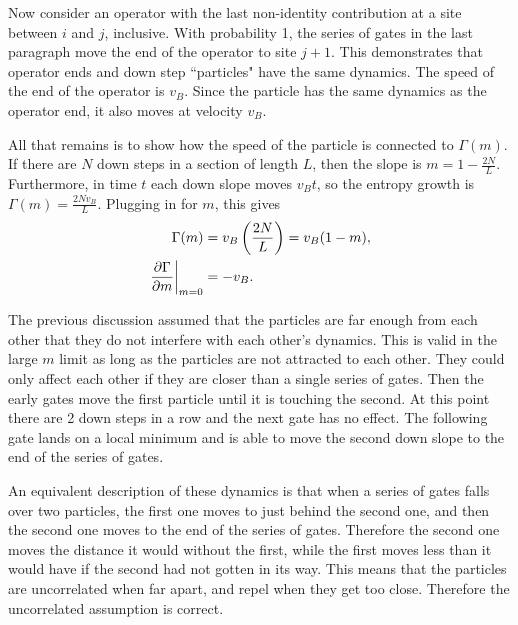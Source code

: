 Now consider an operator with the last non-identity contribution at a site between $i$ and $j$, inclusive. With probability 1, the series of gates in the last paragraph move the end of the operator to site $j+1$. This demonstrates that operator ends and down step ``particles" have the same dynamics. The speed of the end of the operator is $v_B$. Since the particle has the same dynamics as the operator end, it also moves at velocity $v_B$. 

All that remains is to show how the speed of the particle is connected to $\Gamma(m)$. If there are $N$ down steps in a section of length $L$, then the slope is $m = 1-\frac{2N}{L}$. Furthermore, in time $t$ each down slope moves $v_Bt$, so the entropy growth is $\Gamma(m)=\frac{2Nv_B}{L}$. Plugging in for $m$, this gives
\begin{align}
\Gamma(m) &= v_B\left(\frac{2N}{L}\right) = v_B(1-m),\\
\left.\frac{\partial \Gamma}{\partial m}\right|_{m=0}  &= -v_B.
\end{align}

The previous discussion assumed that the particles are far enough from each other that they do not interfere with each other's dynamics. This is valid in the large $m$ limit as long as the particles are not attracted to each other. They could only affect each other if they are closer than a single series of gates. Then the early gates move the first particle until it is touching the second. At this point there are 2 down steps in a row and the next gate has no effect. The following gate lands on a local minimum and is able to move the second down slope to the end of the series of gates.

An equivalent description of these dynamics is that when a series of gates falls over two particles, the first one moves to just behind the second one, and then the second one moves to the end of the series of gates. Therefore the second one moves the distance it would without the first, while the first moves less than it would have if the second had not gotten in its way. This means that the particles are uncorrelated when far apart, and repel when they get too close. Therefore the uncorrelated assumption is correct. 